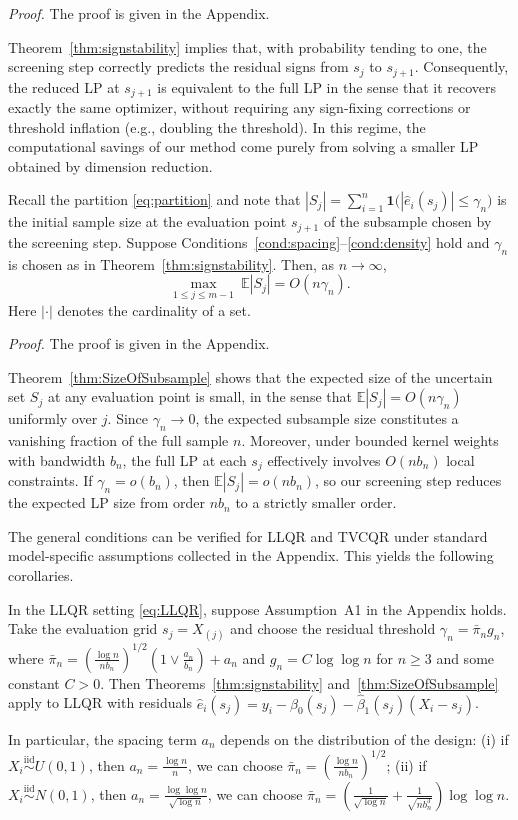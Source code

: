 \documentclass[lineno]{biometrika}
\begin{document}
\noindent\emph{Proof.} The proof is given in the Appendix.

Theorem~\ref{thm:signstability} implies that, with probability tending to one, the screening step correctly predicts the residual signs from $s_j$ to $s_{j+1}$. Consequently, the reduced LP at $s_{j+1}$ is equivalent to the full LP in the sense that it recovers exactly the same optimizer, without requiring any sign-fixing corrections or threshold inflation (e.g., doubling the threshold). In this regime, the computational savings of our method come purely from solving a smaller LP obtained by dimension reduction. 


\begin{theorem}\label{thm:SizeOfSubsample}
Recall the partition \eqref{eq:partition} and note that
$|S_j|=\sum_{i=1}^n \mathbf 1\big(|\hat e_i(s_j)|\le \gamma_n\big)$ is the initial sample size at the evaluation point $s_{j+1}$ of the subsample chosen by the screening step.
Suppose Conditions~\ref{cond:spacing}--\ref{cond:density} hold and $\gamma_n$ is chosen as in Theorem~\ref{thm:signstability}.
Then, as $n\to\infty$,
\[
\max_{1\le j\le m-1}\ \mathbb E|S_j| = O(n\gamma_n).
\]
Here $|\cdot|$ denotes the cardinality of a set.
\end{theorem}

\noindent\emph{Proof.} The proof is given in the Appendix.

Theorem~\ref{thm:SizeOfSubsample} shows that the expected size of the uncertain set $S_j$ at any evaluation point is
small, in the sense that $\mathbb E|S_j|=O(n\gamma_n)$ uniformly over $j$. Since $\gamma_n\to 0$, the expected
subsample size constitutes a vanishing fraction of the full sample $n$. Moreover, under bounded kernel weights with
bandwidth $b_n$, the full LP at each $s_j$ effectively involves $O(n b_n)$ local constraints. If $\gamma_n=o(b_n)$,
then $\mathbb E|S_j|=o(n b_n)$, so our screening step reduces the expected LP size from order $n b_n$ to a strictly
smaller order.

The general conditions can be verified for LLQR and TVCQR under standard model-specific assumptions collected in the
Appendix. This yields the following corollaries.
\begin{corollary}
\label{cor:llqr}
In the LLQR setting \eqref{eq:LLQR}, suppose Assumption~A1 in the Appendix holds.
Take the evaluation grid $s_j=X_{(j)}$ and choose the residual threshold
$\gamma_n=\bar\pi_n g_n$, where
$\bar\pi_n=(\frac{\log n}{nb_n})^{1/2}(1\vee \frac{a_n}{b_n})+a_n$ and $g_n=C\log\log n$ for $n\ge3$ and some constant $C>0$.
Then Theorems~\ref{thm:signstability} and~\ref{thm:SizeOfSubsample} apply to LLQR with residuals
$\hat e_i(s_j)=y_i-\hat\beta_0(s_j)-\hat\beta_1(s_j)(X_i-s_j)$.

In particular, the spacing term $a_n$ depends on the distribution of the design:
(i) if $X_i\stackrel{\mathrm{iid}}{\sim}U(0,1)$, then $a_n=\frac{\log n}{n}$, we can choose $\bar\pi_n=(\frac{\log n}{nb_n})^{1/2}$;
(ii) if $X_i\stackrel{\mathrm{iid}}{\sim}N(0,1)$, then $a_n=\frac{\log\log n}{\sqrt{\log n}}$, we can choose $\bar\pi_n=(\frac{1}{\sqrt{\log n}}+\frac{1}{\sqrt{nb_n^3}})\log\log n$.
\end{corollary}
\end{document}
